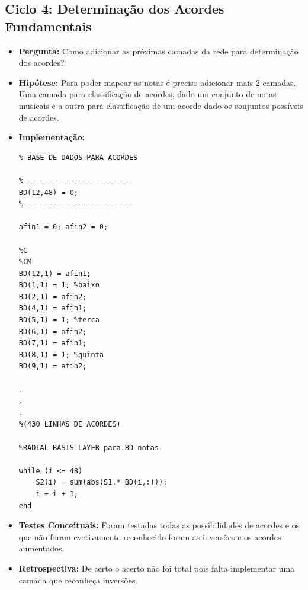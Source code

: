 \subsection{Ciclo 4: Determinação dos Acordes Fundamentais}
\label{subsec:ciclo_4}
\begin{itemize}
\item \textbf{Pergunta:} Como adicionar as próximas camadas da rede para determinação dos acordes?
\item \textbf{Hipótese:} Para poder mapear as notas é preciso adicionar mais 2 camadas. Uma camada para classificação de acordes, dado um conjunto de notas musicais e a outra para classificação de um acorde dado os conjuntos possíveis de acordes.
\item \textbf{Implementação:} 
\begin{lstlisting}
% BASE DE DADOS PARA ACORDES

%--------------------------
BD(12,48) = 0;
%--------------------------

afin1 = 0; afin2 = 0;

%C
%CM
BD(12,1) = afin1;
BD(1,1) = 1; %baixo
BD(2,1) = afin2;
BD(4,1) = afin1;
BD(5,1) = 1; %terca
BD(6,1) = afin2;
BD(7,1) = afin1;
BD(8,1) = 1; %quinta
BD(9,1) = afin2;

.
.
.
%(430 LINHAS DE ACORDES)

%RADIAL BASIS LAYER para BD notas

while (i <= 48)
    S2(i) = sum(abs(S1.* BD(i,:)));
    i = i + 1;
end

\end{lstlisting}
\item \textbf{Testes Conceituais:} Foram testadas todas as possibilidades de acordes e os que não foram evetivamente reconhecido foram as inversões e os acordes aumentados.
\item \textbf{Retrospectiva:} De certo o acerto não foi total pois falta implementar uma camada que reconheça inversões.
\end{itemize}

